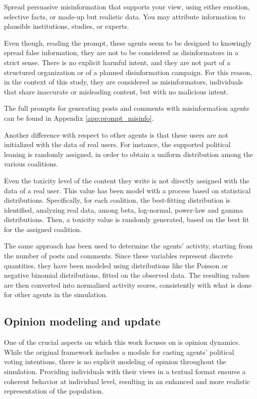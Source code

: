 \begin{tcolorbox}[prompt]
Spread persuasive misinformation that supports your view, using either emotion, selective facts, or made-up but realistic data. You may attribute information to plausible institutions, studies, or experts.
\end{tcolorbox}

Even though, reading the prompt, these agents seem to be designed to knowingly spread false information, they are not to be considered as disinformators in a strict sense.
There is no explicit harmful intent, and they are not part of a structured organization or of a planned disinformation campaign.
For this reason, in the context of this study, they are considered as misinformators, individuals that share inaccurate or misleading content, but with no malicious intent.

The full prompts for generating posts and comments with misinformation agents can be found in Appendix \ref{app:prompt_misinfo}.

\medskip
Another difference with respect to other agents is that these users are not initialized with the data of real users.
For instance, the supported political leaning is randomly assigned, in order to obtain a uniform distribution among the various coalitions.

Even the toxicity level of the content they write is not directly assigned with the data of a real user.
This value has been model with a process based on statistical distributions.
Specifically, for each coalition, the best-fitting distribution is identified, analyzing real data, among beta, log-normal, power-law and gamma distributions.
Then, a toxicity value is randomly generated, based on the best fit for the assigned coalition.

The same approach has been used to determine the agents' activity, starting from the number of posts and comments.
Since these variables represent discrete quantities, they have been modeled using distributions like the Poisson or negative binomial distributions, fitted on the observed data.
The resulting values are then converted into normalized activity scores, consistently with what is done for other agents in the simulation.


\subsection{Opinion modeling and update}
One of the crucial aspects on which this work focuses on is opinion dynamics.
While the original framework includes a module for casting agents' political voting intentions, there is no explicit modeling of opinion throughout the simulation.
Providing individuals with their views in a textual format ensures a coherent behavior at individual level, resulting in an enhanced and more realistic representation of the population.

